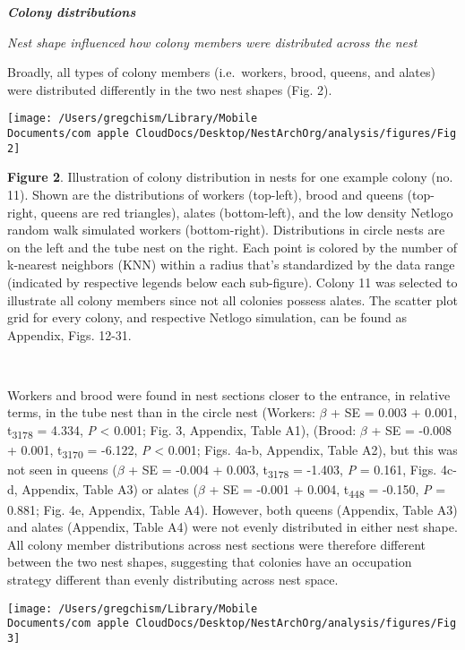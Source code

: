 \documentclass[3p]{elsarticle} %
\begin{document}
\textbf{\emph{Colony distributions}}

\emph{Nest shape influenced how colony members were distributed across
the nest}

Broadly, all types of colony members (i.e.~workers, brood, queens, and
alates) were distributed differently in the two nest shapes (Fig. 2).

\begin{flushleft}\texttt{[image: /Users/gregchism/Library/Mobile Documents/com~apple~CloudDocs/Desktop/NestArchOrg/analysis/figures/Fig2]} \end{flushleft}

\textbf{Figure 2}. Illustration of colony distribution in nests for one
example colony (no. 11). Shown are the distributions of workers
(top-left), brood and queens (top-right, queens are red triangles),
alates (bottom-left), and the low density Netlogo random walk simulated
workers (bottom-right). Distributions in circle nests are on the left
and the tube nest on the right. Each point is colored by the number of
k-nearest neighbors (KNN) within a radius that's standardized by the
data range (indicated by respective legends below each sub-figure).
Colony 11 was selected to illustrate all colony members since not all
colonies possess alates. The scatter plot grid for every colony, and
respective Netlogo simulation, can be found as Appendix, Figs. 12-31.

~

Workers and brood were found in nest sections closer to the entrance, in
relative terms, in the tube nest than in the circle nest (Workers:
\(\beta\) + SE = 0.003 + 0.001, t\textsubscript{3178} = 4.334, \emph{P}
\textless{} 0.001; Fig. 3, Appendix, Table A1), (Brood: \(\beta\) + SE =
-0.008 + 0.001, t\textsubscript{3170} = -6.122, \emph{P} \textless{}
0.001; Figs. 4a-b, Appendix, Table A2), but this was not seen in queens
(\(\beta\) + SE = -0.004 + 0.003, t\textsubscript{3178} = -1.403,
\emph{P} = 0.161, Figs. 4c-d, Appendix, Table A3) or alates (\(\beta\) +
SE = -0.001 + 0.004, t\textsubscript{448} = -0.150, \emph{P} = 0.881;
Fig. 4e, Appendix, Table A4). However, both queens (Appendix, Table A3)
and alates (Appendix, Table A4) were not evenly distributed in either
nest shape. All colony member distributions across nest sections were
therefore different between the two nest shapes, suggesting that
colonies have an occupation strategy different than evenly distributing
across nest space.

\begin{flushleft}\texttt{[image: /Users/gregchism/Library/Mobile Documents/com~apple~CloudDocs/Desktop/NestArchOrg/analysis/figures/Fig3]} \end{flushleft}
\end{document}
